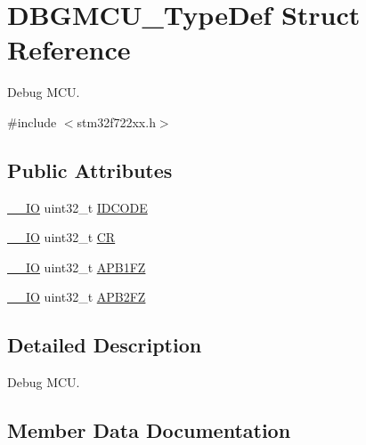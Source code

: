 \hypertarget{struct_d_b_g_m_c_u___type_def}{}\section{D\+B\+G\+M\+C\+U\+\_\+\+Type\+Def Struct Reference}
\label{struct_d_b_g_m_c_u___type_def}


Debug M\+CU.  




{\ttfamily \#include $<$stm32f722xx.\+h$>$}

\subsection*{Public Attributes}
\begin{DoxyCompactItemize}
\item 
\mbox{\hyperlink{core__sc300_8h_aec43007d9998a0a0e01faede4133d6be}{\+\_\+\+\_\+\+IO}} uint32\+\_\+t \mbox{\hyperlink{struct_d_b_g_m_c_u___type_def_a0cc3561c124d06bb57dfa855e43ed99f}{I\+D\+C\+O\+DE}}
\item 
\mbox{\hyperlink{core__sc300_8h_aec43007d9998a0a0e01faede4133d6be}{\+\_\+\+\_\+\+IO}} uint32\+\_\+t \mbox{\hyperlink{struct_d_b_g_m_c_u___type_def_a15981828f2b915d38570cf6684e99a53}{CR}}
\item 
\mbox{\hyperlink{core__sc300_8h_aec43007d9998a0a0e01faede4133d6be}{\+\_\+\+\_\+\+IO}} uint32\+\_\+t \mbox{\hyperlink{struct_d_b_g_m_c_u___type_def_aac341c7e09cd5224327eeb7d9f122bed}{A\+P\+B1\+FZ}}
\item 
\mbox{\hyperlink{core__sc300_8h_aec43007d9998a0a0e01faede4133d6be}{\+\_\+\+\_\+\+IO}} uint32\+\_\+t \mbox{\hyperlink{struct_d_b_g_m_c_u___type_def_a011f892d86367dbe786964b14bc515a6}{A\+P\+B2\+FZ}}
\end{DoxyCompactItemize}


\subsection{Detailed Description}
Debug M\+CU. 

\subsection{Member Data Documentation}
\mbox{\label{struct_d_b_g_m_c_u___type_def_aac341c7e09cd5224327eeb7d9f122bed}} 
